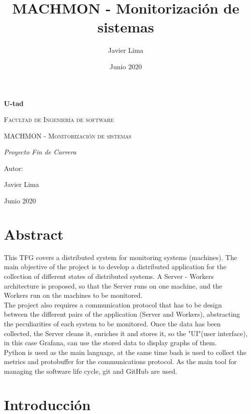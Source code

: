 \documentclass[ spanish, a4paper, 12pt, oneside]{report}
\title{\Huge MACHMON - Monitorización de sistemas }
\author{Javier Lima}
\date{Junio 2020}
\begin{document}
\begin{titlepage}
   \centering
   {\bfseries\LARGE U-tad \par}
   \vspace{1cm}
   {\scshape\Large Facultad de Ingeniería de software \par}
   \vspace{3cm}
   {\scshape\Huge MACHMON - Monitorización de sistemas \par}
   \vspace{3cm}
   {\itshape\Large Proyecto Fin de Carrera \par}
   \vfill
   {\Large Autor: \par}
   {\Large Javier Lima \par}
   \vfill
   {\Large Junio 2020 \par}
\end{titlepage}

\tableofcontents{}
\newpage

\chapter{Abstract}


This TFG covers a distributed system for monitoring systems (machines). The main objective of the project is to develop a distributed application for 
the collection of different states of distributed systems. A Server - Workers architecture is proposed, so that the Server runs on one machine, and the Workers 
run on the machines to be monitored. \\

The project also requires a communication protocol that has to be design between the different pairs of the application (Server and Workers), abstracting 
the peculiarities of each system to be monitored. Once the data has been collected, the Server cleans it, enriches it and stores it, so the "UI"(user interface), 
in this case Grafana, can use the stored data to display graphs of them. \\

Python is used as the main language, at the same time bash is used to collect the metrics and protobuffer for the communications protocol. As the main tool for 
managing the software life cycle, git and GitHub are used. \\

\chapter{Introducción}
\end{document}
